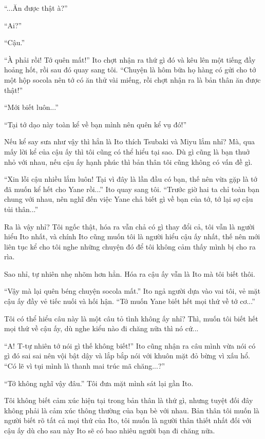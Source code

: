 {``...Ăn được thật à?''

``Ai?''

``Cậu.''

``À phải rồi! Tớ quên mất!'' Ito chợt nhận ra thứ gì đó và kêu lên một
tiếng đầy hoảng hốt, rồi sau đó quay sang tôi. ``Chuyện là hôm bữa họ
hàng có gửi cho tớ một hộp socola nên tớ có ăn thử vài miếng, rồi chợt
nhận ra là bản thân ăn được thật!''

``Mới biết luôn...''

``Tại tớ dạo này toàn kể về bạn mình nên quên kể vụ đó!''

Nếu kể say sưa như vậy thì hẳn là Ito thích Tsubaki và Miyu lắm nhỉ? Mà,
qua mấy lời kể của cậu ấy thì tôi cũng có thể hiểu tại sao. Dù gì cũng
là bạn thuở nhỏ với nhau, nếu cậu ấy hạnh phúc thì bản thân tôi cũng
không có vấn đề gì.

``Xin lỗi cậu nhiều lắm luôn! Tại vì đây là lần đầu có bạn, thế nên vừa
gặp là tớ đã muốn kể hết cho Yane rồi...'' Ito quay sang tôi. ``Trước
giờ hai ta chỉ toàn bạn chung với nhau, nên nghĩ đến việc Yane chả biết
gì về bạn của tớ, tớ lại sợ cậu tủi thân...''

Ra là vậy nhỉ? Tôi ngốc thật, hóa ra vẫn chả có gì thay đổi cả, tôi vẫn
là người hiểu Ito nhất, và chính Ito cũng muốn tôi là người hiểu cậu ấy
nhất, thế nên mới liên tục kể cho tôi nghe những chuyện đó để tôi không
cảm thấy mình bị cho ra rìa.

Sao nhỉ, tự nhiên nhẹ nhõm hơn hẳn. Hóa ra cậu ấy vẫn là Ito mà tôi biết
thôi.

``Vậy mà lại quên béng chuyện socola mất.'' Ito ngả người dựa vào vai
tôi, vẻ mặt cậu ấy đầy vẻ tiếc nuối và hối hận. ``Tớ muốn Yane biết hết
mọi thứ về tớ cơ...''

Tôi có thể hiểu câu này là một câu tỏ tình không ấy nhỉ? Thì, muốn tôi
biết hết mọi thứ về cậu ấy, dù nghe kiểu nào đi chăng nữa thì nó cứ...

``A! T-tự nhiên tớ nói gì thế không biết!'' Ito cũng nhận ra câu mình
vừa nói có gì đó sai sai nên vội bật dậy và lắp bắp nói với khuôn mặt đỏ
bừng vì xấu hổ. ``Có lẽ vì tụi mình là thanh mai trúc mã chăng...?''

``Tớ không nghĩ vậy đâu.'' Tôi đưa mặt mình sát lại gần Ito.

Tôi không biết cảm xúc hiện tại trong bản thân là thứ gì, nhưng tuyệt
đối đây không phải là cảm xúc thông thường của bạn bè với nhau. Bản thân
tôi muốn là người biết rõ tất cả mọi thứ của Ito, tôi muốn là người thân
thiết nhất đối với cậu ấy dù cho sau này Ito sẽ có bao nhiêu người bạn
đi chăng nữa.

}
